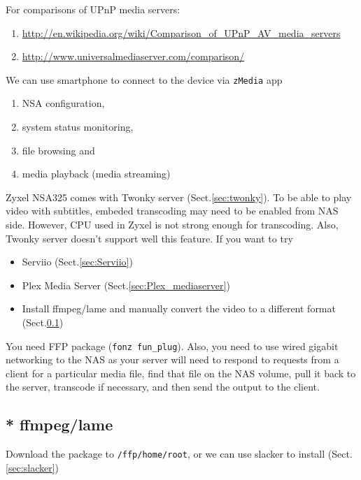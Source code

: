 For comparisons of UPnP media servers:

\begin{enumerate}
  \item \url{http://en.wikipedia.org/wiki/Comparison_of_UPnP_AV_media_servers}
  \item \url{http://www.universalmediaserver.com/comparison/}
\end{enumerate}


We can use smartphone to connect to the device via \verb!zMedia! app 
\begin{enumerate}
  \item NSA configuration, 
  \item system status monitoring, 
  \item file browsing and 
  \item media playback (media streaming)
\end{enumerate}

Zyxel NSA325 comes with Twonky server (Sect.\ref{sec:twonky}).
To be able to play video with subtitles, embeded transcoding may need to be
enabled from NAS side. However, CPU used in Zyxel is not strong enough for
transcoding. Also, Twonky server doesn't support well this feature. If you want
to try
\begin{itemize}
  \item Serviio (Sect.\ref{sec:Serviio})
  \item Plex Media Server (Sect.\ref{sec:Plex_mediaserver})  
  \item Install ffmpeg/lame and manually convert the video to a different
  format (Sect.\ref{sec:ffmpeg-lame})
\end{itemize}

You need FFP package (\verb!fonz fun_plug!).
Also, you need to use wired gigabit networking to the NAS as your server will
need to respond to requests from a client for a particular media file, find that
file on the NAS volume, pull it back to the server, transcode if necessary, and
then send the output to the client.

\subsection{* ffmpeg/lame}
\label{sec:ffmpeg-lame}

Download the package to \verb!/ffp/home/root!, or we can use slacker to install
(Sect.\ref{sec:slacker})

